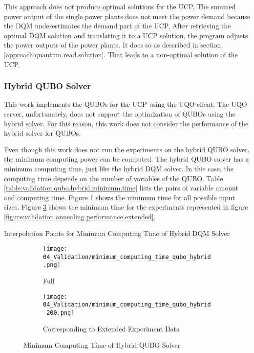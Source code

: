 This approach does not produce optimal solutions for the UCP.
The summed power output of the single power plants does not meet the power demand because the DQM underestimates the demand part of the UCP.
After retrieving the optimal DQM solution and translating it to a UCP solution, the program adjusts the power outputs of the power plants.
It does so as described in section \ref{approach:quantum.read.solution}.
That leads to a non-optimal solution of the UCP.

\subsubsection{Hybrid QUBO Solver}

This work implements the QUBOs for the UCP using the UQO-client.
The UQO-server, unfortunately, does not support the optimization of QUBOs using the hybrid solver.
For this reason, this work does not consider the performance of the hybrid solver for QUBOs.

Even though this work does not run the experiments on the hybrid QUBO solver, the minimum computing power can be computed.
The hybrid QUBO solver has a minimum computing time, just like the hybrid DQM solver.
In this case, the computing time depends on the number of variables of the QUBO.
Table \ref{table:validation.qubo.hybrid.minimum.time} lists the pairs of variable amount and computing time.
Figure \ref{figure:validation.qubo.hybrid.minimum.time} shows the minimum time for all possible input sizes.
Figure \ref{figure:validation.qubo.hybrid.minimum.time.200} shows the minimum time for the experiments represented in figure \ref{figure:validation.annealing.performance.extended}.
\begin{table}[ht]
  \centering
  
  \caption{Interpolation Points for Minimum Computing Time of Hybrid DQM Solver}
  \label{table:validation.qubo.hybrid.minimum.time}
\end{table}
\begin{figure} [ht]
  \begin{subfigure}[b]{0.5 \textwidth}
    \centering
    \texttt{[image: 04\_Validation/minimum\_computing\_time\_qubo\_hybrid.png]}
    \caption{Full}
    \label{figure:validation.qubo.hybrid.minimum.time}
  \end{subfigure}
  \begin{subfigure}[b]{0.5 \textwidth}
    \centering
    \texttt{[image: 04\_Validation/minimum\_computing\_time\_qubo\_hybrid\_200.png]}
    \caption{Corresponding to Extended Experiment Data}
    \label{figure:validation.qubo.hybrid.minimum.time.200}
  \end{subfigure}
  \caption{Minimum Computing Time of Hybrid QUBO Solver}
\end{figure}

